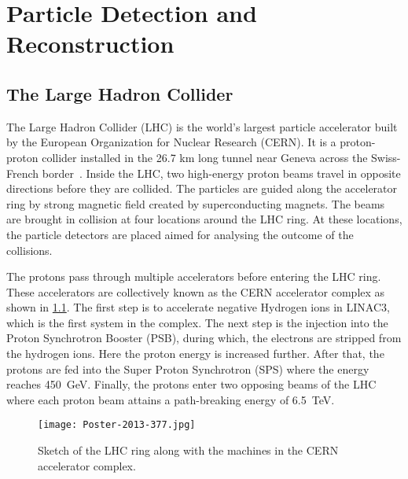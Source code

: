 
\chapter{Particle Detection and Reconstruction}
\label{sec:LHCATLAS}



\section{The Large Hadron Collider}
The Large Hadron Collider (LHC) is the world's largest particle accelerator built by the 
European Organization for Nuclear Research (CERN). It is a proton-proton collider 
installed in the 26.7 km long tunnel near Geneva across the Swiss-French border~\cite{LyndonEvans_2008}. 
Inside the LHC, two high-energy proton beams travel in opposite directions before they are collided.
The particles are guided along the accelerator ring by strong magnetic field created by superconducting
magnets. The beams are brought in collision at four locations around the LHC ring. At these locations, 
the particle detectors are placed aimed for analysing the outcome of the collisions.

The protons pass through multiple accelerators before entering the LHC ring. These accelerators are
collectively known as the CERN accelerator complex as shown in \cref{fig:acc_complex}. The first step 
is to accelerate negative Hydrogen ions in LINAC3, which is the first system in the
complex. The next step is the injection into the Proton Synchrotron Booster (PSB), during which, 
the electrons are stripped from the hydrogen ions. Here the proton energy is increased further. After 
that, the protons are fed into the Super Proton Synchrotron (SPS) where the energy reaches \qty{450}{\GeV}. 
Finally, the protons enter two opposing beams of the LHC where each proton beam attains a 
path-breaking energy of \qty{6.5}{\TeV}. 

\begin{figure}[htbp]
    \centering
    \texttt{[image: Poster-2013-377.jpg]}
    \caption[Sketch of the CERN accelerator complex]{Sketch of the LHC ring along with the machines in the CERN accelerator complex\cite{Haffner:1621894}.}%
    \label{fig:acc_complex}
\end{figure}

